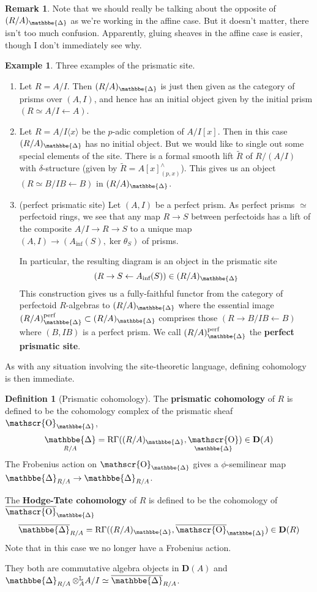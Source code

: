 \documentclass[12pt]{amsproc}
\theoremstyle{definition}
\newtheorem*{definition}{Definition}
\newtheorem*{example}{Example}
\newtheorem*{remark}{Remark}
\newcommand{\sma}{\wedge}
\newcommand{\htpyeq}{\simeq}
\newcommand{\ra}{\rightarrow}
\DeclareMathOperator{\prism}{\mathbbe{\Delta}}
\DeclareMathOperator{\RGamma}{R\Gamma}
\DeclareMathOperator{\Oh}{\mathscr{O}}
\DeclareMathOperator{\DerivedL}{\mathbb{L}}
\begin{document}
\begin{remark} Note that we should really be talking about the opposite of $(R/A)_{\prism}$ as we're working in the affine case. But it doesn't matter, there isn't too much confusion. Apparently, gluing sheaves in the affine case is easier, though I don't immediately see why.
\end{remark}

\begin{example}
Three examples of the prismatic site.

\begin{enumerate}
\item Let $R=A/I$. Then $(R/A)_{\prism}$ is just then given as the category of prisms over $(A,I)$, and hence has an initial object given by the initial prism $(R\htpyeq A/I\leftarrow A)$.
\item Let $R=A/I\langle x\rangle$ be the $p$-adic completion of $A/I[x]$. Then in this case $(R/A)_{\prism}$ has no initial object. But we would like to single out some special elements of the site. There is a formal smooth lift $\tilde{R}$ of $R/(A/I)$ with $\delta$-structure (given by $\tilde{R}=A[x]^{\sma}_{(p,x)}$). This gives us an object $(R\htpyeq B/IB\leftarrow B)$ in $(R/A)_{\prism}$. 
\item (perfect prismatic site) Let $(A,I)$ be a perfect prism. As perfect prisms $\htpyeq$ perfectoid rings, we see that any map $R\ra S$ between perfectoids has a lift of the composite $A/I\ra R\ra S$ to a unique map $(A,I)\ra (A_{\text{inf}}(S),\ker{\theta_S})$ of prisms.

In particular, the resulting diagram is an object in the prismatic site 
\[ (R\ra S\leftarrow A_{\text{inf}}(S))\in (R/A)_{\prism}\]
This construction gives us a fully-faithful functor from the category of perfectoid $R$-algebras to $(R/A)_{\prism}$ where the essential image $(R/A)_{\prism}^{\text{perf}}\subset (R/A)_{\prism}$ comprises those $(R\ra B/IB\leftarrow B)$ where $(B,IB)$ is a perfect prism. We call $(R/A)_{\prism}^{\text{perf}}$ the \textbf{perfect prismatic site}.
\end{enumerate}
\end{example}

As with any situation involving the site-theoretic language, defining cohomology is then immediate.

\begin{definition}[Prismatic cohomology] The \textbf{prismatic cohomology} of $R$ is defined to be the cohomology complex of the prismatic sheaf $\Oh_{\prism}$,
\[	\prism_{R/A}=\RGamma((R/A)_{\prism},\Oh_{\prism})\in \mathbf{D}(A)	\]
The Frobenius action on $\Oh_{\prism}$ gives a $\phi$-semilinear map $\prism_{R/A}\ra\prism_{R/A}$.

The \textbf{Hodge-Tate cohomology} of $R$ is defined to be the cohomology of $\overline{\Oh}_{\prism}$
\[	\overline{\prism}_{R/A}=\RGamma((R/A)_{\prism},\overline{\Oh}_{\prism})\in \mathbf{D}(R) \]
Note that in this case we no longer have a Frobenius action.

They both are commutative algebra objects in $\mathbf{D}(A)$ and $\prism_{R/A}\otimes^{\DerivedL}_A A/I\htpyeq \overline{\prism}_{R/A}$.
\end{definition}
\end{document}
